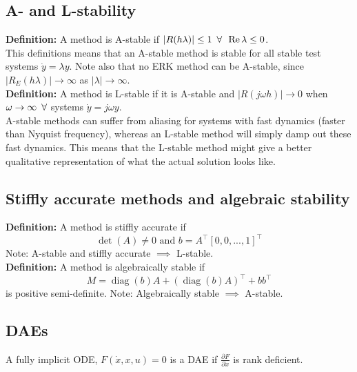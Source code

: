 \subsection{A- and L-stability}
\textbf{Definition:} A method is A-stable if $|R(h\lambda)| \leq 1 \enskip \forall \enskip \operatorname{Re} \lambda \leq 0$.\\
This definitions means that an A-stable method is stable for all stable test systems $\dot{y} = \lambda y$. Note also that no ERK method can be A-stable, since $|R_E(h\lambda)| \to \infty$ as $|\lambda| \to \infty$.\\
\textbf{Definition:} A method is L-stable if it is A-stable and $|R(j\omega h)| \to 0$ when $\omega \to \infty \enskip \forall$ systems $\dot{y} = j\omega y$.\\
A-stable methods can suffer from aliasing for systems with fast dynamics (faster than Nyquist frequency), whereas an L-stable method will simply damp out these fast dynamics. This means that the L-stable method might give a better qualitative representation of what the actual solution looks like.

\subsection{Stiffly accurate methods and algebraic stability}
\textbf{Definition:} A method is stiffly accurate if
\begin{equation}
    \det(A) \neq 0 \text{ and } b = A^\top [0, 0, ..., 1]^\top
\end{equation}
Note: A-stable and stiffly accurate $\implies$ L-stable.\\
\textbf{Definition:} A method is algebraically stable if 
\begin{equation}
    M = \operatorname{diag}(b)A + (\operatorname{diag}(b)A)^\top + bb^\top
\end{equation}
is positive semi-definite. Note: Algebraically stable $\implies$ A-stable.

\subsection{DAEs}
A fully implicit ODE, $F(\dot{x}, x, u) = 0$ is a DAE if $\frac{\partial F}{\partial \dot{x}}$ is rank deficient.